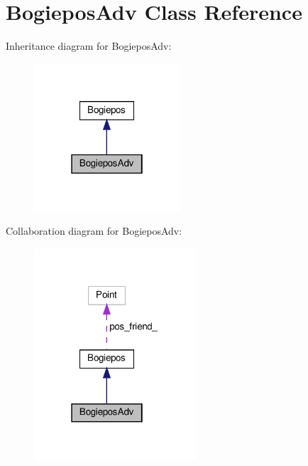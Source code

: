 \hypertarget{classBogieposAdv}{}\section{Bogiepos\+Adv Class Reference}
\label{classBogieposAdv}


Inheritance diagram for Bogiepos\+Adv\+:\nopagebreak
\begin{figure}[H]
\begin{center}
\leavevmode
\includegraphics[width=154pt]{classBogieposAdv__inherit__graph}
\end{center}
\end{figure}


Collaboration diagram for Bogiepos\+Adv\+:\nopagebreak
\begin{figure}[H]
\begin{center}
\leavevmode
\includegraphics[width=171pt]{classBogieposAdv__coll__graph}
\end{center}
\end{figure}
